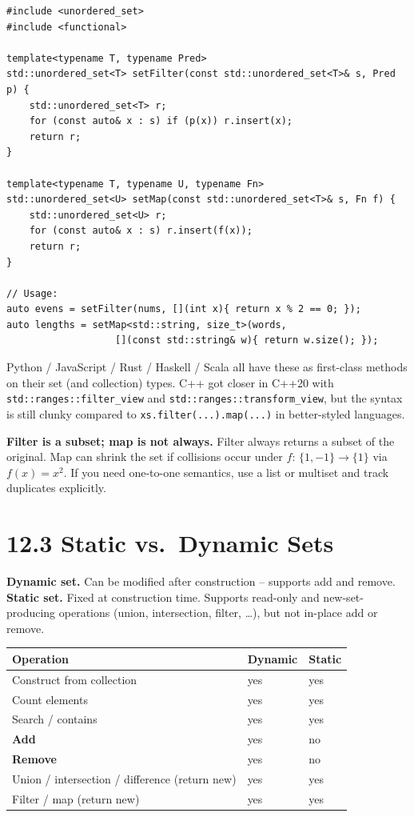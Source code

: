 \documentclass[11pt]{article}
\begin{document}
\begin{lstlisting}[basicstyle=\ttfamily\small,frame=single]
#include <unordered_set>
#include <functional>

template<typename T, typename Pred>
std::unordered_set<T> setFilter(const std::unordered_set<T>& s, Pred p) {
    std::unordered_set<T> r;
    for (const auto& x : s) if (p(x)) r.insert(x);
    return r;
}

template<typename T, typename U, typename Fn>
std::unordered_set<U> setMap(const std::unordered_set<T>& s, Fn f) {
    std::unordered_set<U> r;
    for (const auto& x : s) r.insert(f(x));
    return r;
}

// Usage:
auto evens = setFilter(nums, [](int x){ return x % 2 == 0; });
auto lengths = setMap<std::string, size_t>(words,
                   [](const std::string& w){ return w.size(); });
\end{lstlisting}

Python / JavaScript / Rust / Haskell / Scala all have these as first-class methods on their set (and collection) types. C++ got closer in C++20 with \texttt{std::ranges::filter\_view} and \texttt{std::ranges::transform\_view}, but the syntax is still clunky compared to \texttt{xs.filter(...).map(...)} in better-styled languages.

\begin{notebox}
\textbf{Filter is a subset; map is not always.} Filter always returns a subset of the original. Map can shrink the set if collisions occur under $f$: $\{1, -1\} \to \{1\}$ via $f(x) = x^2$. If you need one-to-one semantics, use a list or multiset and track duplicates explicitly.
\end{notebox}

\section{12.3 Static vs.\ Dynamic Sets}

\begin{defnbox}
\textbf{Dynamic set.} Can be modified after construction -- supports add and remove.
\textbf{Static set.} Fixed at construction time. Supports read-only and new-set-producing operations (union, intersection, filter, \ldots), but not in-place add or remove.
\end{defnbox}

\begin{center}
\begin{tabular}{lll}
\hline
Operation & Dynamic & Static \\
\hline
Construct from collection & yes & yes \\
Count elements & yes & yes \\
Search / contains & yes & yes \\
\textbf{Add} & yes & no \\
\textbf{Remove} & yes & no \\
Union / intersection / difference (return new) & yes & yes \\
Filter / map (return new) & yes & yes \\
\hline
\end{tabular}
\end{center}
\end{document}

